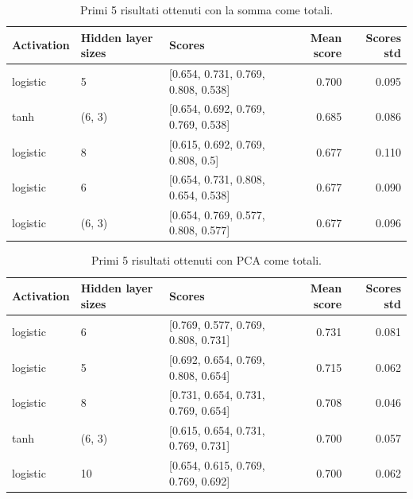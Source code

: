 \documentclass[12pt, twoside, letterpaper]{report}
\begin{document}
				\begin{table}
					\begin{tabular}{lllrr}
					\toprule
					Activation & Hidden layer sizes &                               Scores &  Mean score &  Scores std \\
					\midrule
					logistic &                  5 &  [0.654, 0.731, 0.769, 0.808, 0.538] &       0.700 &       0.095 \\
					tanh &             (6, 3) &  [0.654, 0.692, 0.769, 0.769, 0.538] &       0.685 &       0.086 \\
					logistic &                  8 &    [0.615, 0.692, 0.769, 0.808, 0.5] &       0.677 &       0.110 \\
					logistic &                  6 &  [0.654, 0.731, 0.808, 0.654, 0.538] &       0.677 &       0.090 \\
					logistic &             (6, 3) &  [0.654, 0.769, 0.577, 0.808, 0.577] &       0.677 &       0.096 \\
					\bottomrule
					\end{tabular}
					\caption{Primi 5 risultati ottenuti con la somma come totali.}
					\label{tab:totali_somma}
				\end{table}
				\begin{table}
					\begin{tabular}{lllrr}
					\toprule
					Activation & Hidden layer sizes &                               Scores &  Mean score &  Scores std \\
					\midrule
					logistic &                  6 &  [0.769, 0.577, 0.769, 0.808, 0.731] &       0.731 &       0.081 \\
					logistic &                  5 &  [0.692, 0.654, 0.769, 0.808, 0.654] &       0.715 &       0.062 \\
					logistic &                  8 &  [0.731, 0.654, 0.731, 0.769, 0.654] &       0.708 &       0.046 \\
					tanh &             (6, 3) &  [0.615, 0.654, 0.731, 0.769, 0.731] &       0.700 &       0.057 \\
					logistic &                 10 &  [0.654, 0.615, 0.769, 0.769, 0.692] &       0.700 &       0.062 \\
					\bottomrule
					\end{tabular}
					\caption{Primi 5 risultati ottenuti con PCA come totali.}
					\label{tab:totali_pca}
				\end{table}
\end{document}
